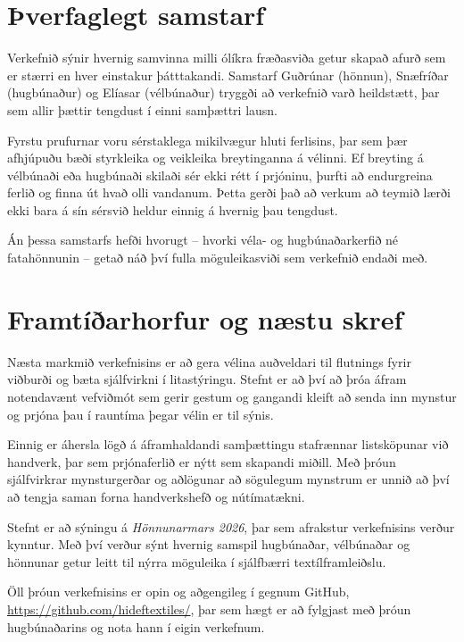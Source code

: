 \documentclass[a4paper,10pt,twocolumn]{article}
\begin{document}
\section{Þverfaglegt samstarf}
Verkefnið sýnir hvernig samvinna milli ólíkra fræðasviða getur skapað afurð sem er stærri en hver einstakur þátttakandi. Samstarf Guðrúnar (hönnun), Snæfríðar (hugbúnaður) og Elíasar (vélbúnaður) tryggði að verkefnið varð heildstætt, þar sem allir þættir tengdust í einni samþættri lausn.

Fyrstu prufurnar voru sérstaklega mikilvægur hluti ferlisins, þar sem þær afhjúpuðu bæði styrkleika og veikleika breytinganna á vélinni. Ef breyting á vélbúnaði eða hugbúnaði skilaði sér ekki rétt í prjóninu, þurfti að endurgreina ferlið og finna út hvað olli vandanum. Þetta gerði það að verkum að teymið lærði ekki bara á sín sérsvið heldur einnig á hvernig þau tengdust.

Án þessa samstarfs hefði hvorugt -- hvorki véla- og hugbúnaðarkerfið né fatahönnunin -- getað náð því fulla möguleikasviði sem verkefnið endaði með.


\section{Framtíðarhorfur og næstu skref}
Næsta markmið verkefnisins er að gera vélina auðveldari til flutnings fyrir viðburði og bæta sjálfvirkni í litastýringu. 
Stefnt er að því að þróa áfram notendavænt vefviðmót sem gerir gestum og gangandi kleift að senda inn mynstur og prjóna þau í rauntíma þegar vélin er til sýnis.

Einnig er áhersla lögð á áframhaldandi samþættingu stafrænnar listsköpunar við handverk, 
þar sem prjónaferlið er nýtt sem skapandi miðill. Með þróun sjálfvirkrar mynsturgerðar og aðlögunar að sögulegum mynstrum 
er unnið að því að tengja saman forna handverkshefð og nútímatækni.

Stefnt er að sýningu á \emph{Hönnunarmars 2026}, þar sem afrakstur verkefnisins verður kynntur. Með því verður sýnt hvernig
samspil hugbúnaðar, vélbúnaðar og hönnunar getur leitt til nýrra möguleika í sjálfbærri textílframleiðslu.

Öll þróun verkefnisins er opin og aðgengileg í gegnum GitHub, \url{https://github.com/hideftextiles/}, þar sem hægt er að fylgjast með þróun hugbúnaðarins og nota hann í eigin verkefnum. 

\printbibliography
\end{document}
